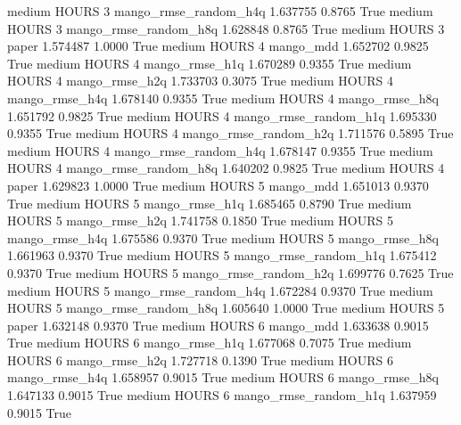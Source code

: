     medium    HOURS                 3 mango_rmse_random_h4q   1.637755      0.8765    True
    medium    HOURS                 3 mango_rmse_random_h8q   1.628848      0.8765    True
    medium    HOURS                 3                 paper   1.574487      1.0000    True
    medium    HOURS                 4             mango_mdd   1.652702      0.9825    True
    medium    HOURS                 4        mango_rmse_h1q   1.670289      0.9355    True
    medium    HOURS                 4        mango_rmse_h2q   1.733703      0.3075    True
    medium    HOURS                 4        mango_rmse_h4q   1.678140      0.9355    True
    medium    HOURS                 4        mango_rmse_h8q   1.651792      0.9825    True
    medium    HOURS                 4 mango_rmse_random_h1q   1.695330      0.9355    True
    medium    HOURS                 4 mango_rmse_random_h2q   1.711576      0.5895    True
    medium    HOURS                 4 mango_rmse_random_h4q   1.678147      0.9355    True
    medium    HOURS                 4 mango_rmse_random_h8q   1.640202      0.9825    True
    medium    HOURS                 4                 paper   1.629823      1.0000    True
    medium    HOURS                 5             mango_mdd   1.651013      0.9370    True
    medium    HOURS                 5        mango_rmse_h1q   1.685465      0.8790    True
    medium    HOURS                 5        mango_rmse_h2q   1.741758      0.1850    True
    medium    HOURS                 5        mango_rmse_h4q   1.675586      0.9370    True
    medium    HOURS                 5        mango_rmse_h8q   1.661963      0.9370    True
    medium    HOURS                 5 mango_rmse_random_h1q   1.675412      0.9370    True
    medium    HOURS                 5 mango_rmse_random_h2q   1.699776      0.7625    True
    medium    HOURS                 5 mango_rmse_random_h4q   1.672284      0.9370    True
    medium    HOURS                 5 mango_rmse_random_h8q   1.605640      1.0000    True
    medium    HOURS                 5                 paper   1.632148      0.9370    True
    medium    HOURS                 6             mango_mdd   1.633638      0.9015    True
    medium    HOURS                 6        mango_rmse_h1q   1.677068      0.7075    True
    medium    HOURS                 6        mango_rmse_h2q   1.727718      0.1390    True
    medium    HOURS                 6        mango_rmse_h4q   1.658957      0.9015    True
    medium    HOURS                 6        mango_rmse_h8q   1.647133      0.9015    True
    medium    HOURS                 6 mango_rmse_random_h1q   1.637959      0.9015    True

